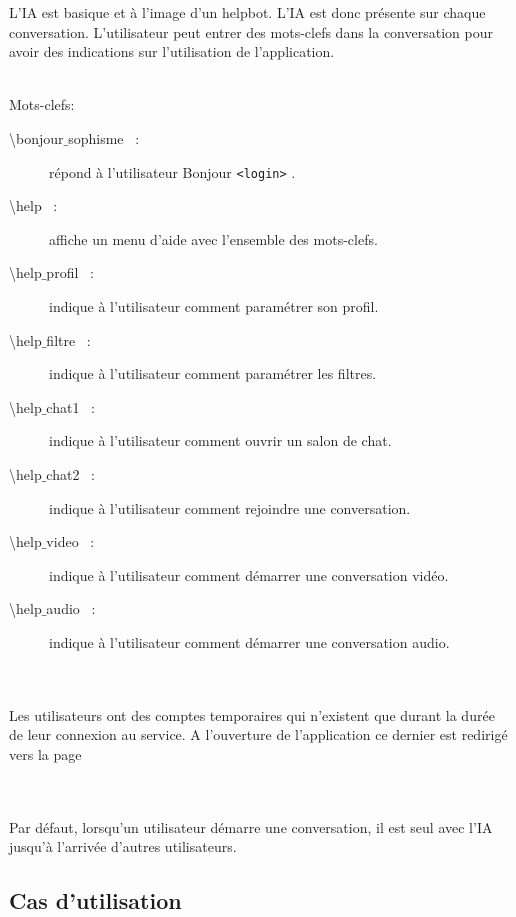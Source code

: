\documentclass[11pt,dvipsnames,svgnames]{report}
\begin{document}
\begin{mdframed}[topline=false,rightline=false,bottomline=false, linewidth=3pt,linecolor=red]
L'IA est basique et à l'image d'un helpbot. L'IA est donc présente sur chaque conversation. L'utilisateur peut entrer des mots-clefs dans la conversation pour avoir des indications sur l'utilisation de l'application.

~\\
Mots-clefs:
\begin{description}
\item[\og \textbackslash bonjour$\_$sophisme \fg\ :] répond à l'utilisateur \og Bonjour \texttt{<login>} \fg.
\item[\og \textbackslash help \fg\ :] affiche un menu d'aide avec l'ensemble des mots-clefs.
\item[\og \textbackslash help$\_$profil \fg\ :] indique à l'utilisateur comment paramétrer son profil.
\item[\og \textbackslash help$\_$filtre \fg\ :] indique à l'utilisateur comment paramétrer les filtres.
\item[\og \textbackslash help$\_$chat1 \fg\ :] indique à l'utilisateur comment ouvrir un salon de chat.
\item[\og \textbackslash help$\_$chat2 \fg\ :] indique à l'utilisateur comment rejoindre une conversation.
\item[\og \textbackslash help$\_$video \fg\ :] indique à l'utilisateur comment démarrer une conversation vidéo.
\item[\og \textbackslash help$\_$audio \fg\ :] indique à l'utilisateur comment démarrer une conversation audio.
\end{description}

~\\\\

Les utilisateurs ont des comptes temporaires qui n'existent que durant la durée de leur connexion au service. A l'ouverture de l'application ce dernier est redirigé vers la page %

~\\\\
Par défaut, lorsqu'un utilisateur démarre une conversation, il est seul avec l'IA jusqu'à l'arrivée d'autres utilisateurs.
\end{mdframed}
\subsection*{Cas d'utilisation}
\end{document}
